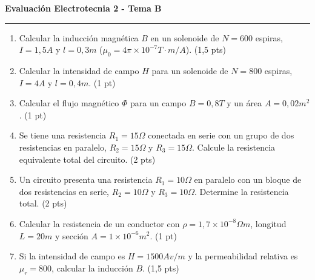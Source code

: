 \documentclass[a4paper,11pt]{article}
\begin{document}
\begin{minipage}[t][0.48\textheight][t]{0.48\textwidth}
  \centering \textbf{Evaluación Electrotecnia 2 - Tema B} \\
  \rule{\textwidth}{0.4pt}
  \begin{enumerate}
    \item Calcular la inducción magnética $B$ en un solenoide de
      $N=600$ espiras, $I=1,5A$ y $l=0,3m$ ($\mu_0=4\pi \times
      10^{-7} T\cdot m/A$). (1,5 pts)
    \item Calcular la intensidad de campo $H$ para un solenoide de
      $N=800$ espiras, $I=4A$ y $l=0,4m$. (1 pt)
    \item Calcular el flujo magnético $\Phi$ para un campo $B=0,8T$ y
      un área $A=0,02m^2$. (1 pt)
    \item Se tiene una resistencia $R_1=15\Omega$ conectada en serie
      con un grupo de dos resistencias en paralelo, $R_2=15\Omega$ y
      $R_3=15\Omega$. Calcule la resistencia equivalente total del
      circuito. (2 pts)
    \item Un circuito presenta una resistencia $R_1=10\Omega$ en
      paralelo con un bloque de dos resistencias en serie,
      $R_2=10\Omega$ y $R_3=10\Omega$. Determine la resistencia total. (2 pts)
    \item Calcular la resistencia de un conductor con $\rho=1,7
      \times 10^{-8} \Omega m$, longitud $L=20m$ y sección $A=1
      \times 10^{-6} m^2$. (1 pt)
    \item Si la intensidad de campo es $H=1500 Av/m$ y la
      permeabilidad relativa es $\mu_r=800$, calcular la inducción
      $B$. (1,5 pts)
  \end{enumerate}
\end{minipage}

\vfill
\end{document}
